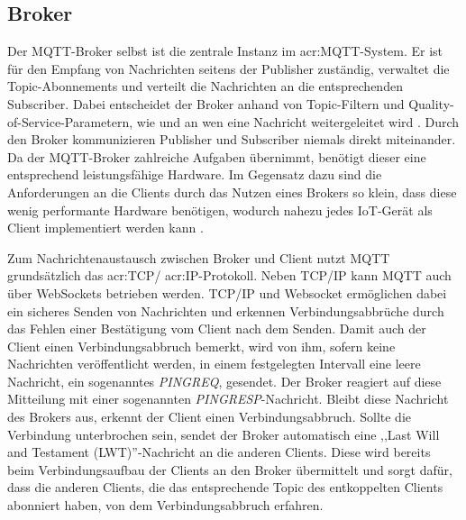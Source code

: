    \subsection{Broker}
        Der MQTT-Broker selbst ist die zentrale Instanz im \gls{acr:MQTT}-System. Er ist für den Empfang von Nachrichten seitens der Publisher zuständig, verwaltet die Topic-Abonnements und verteilt die Nachrichten an die entsprechenden Subscriber.
        Dabei entscheidet der Broker anhand von Topic-Filtern und Quality-of-Service-Parametern, wie und an wen eine Nachricht weitergeleitet wird \autocite[11]{hivemqMQTTMQTT5}. Durch den Broker kommunizieren Publisher und Subscriber niemals direkt miteinander. Da der MQTT-Broker zahlreiche Aufgaben übernimmt, benötigt dieser eine entsprechend leistungsfähige Hardware. Im Gegensatz dazu sind die Anforderungen an die Clients durch das Nutzen eines Brokers so klein, dass diese wenig performante Hardware benötigen, wodurch nahezu jedes IoT-Gerät als Client implementiert werden kann  \autocite[117--118]{angewandteNetzwerktechnik}. 
        
        Zum Nachrichtenaustausch zwischen Broker und Client nutzt MQTT grundsätzlich das \gls{acr:TCP}/ \gls{acr:IP}-Protokoll. Neben TCP/IP kann MQTT auch über WebSockets betrieben werden. TCP/IP und Websocket ermöglichen dabei ein sicheres Senden von Nachrichten und erkennen Verbindungsabbrüche durch das Fehlen einer Bestätigung vom Client nach dem Senden. Damit auch der Client einen Verbindungsabbruch bemerkt, wird von ihm, sofern keine Nachrichten veröffentlicht werden, in einem festgelegten Intervall eine leere Nachricht, ein sogenanntes \textit{PINGREQ}, gesendet. Der Broker reagiert auf diese Mitteilung mit einer sogenannten \textit{PINGRESP}-Nachricht. Bleibt diese Nachricht des Brokers aus, erkennt der Client einen Verbindungsabbruch. Sollte die Verbindung unterbrochen sein, sendet der Broker automatisch eine ,,Last Will and Testament (LWT)''-Nachricht an die anderen Clients. Diese wird bereits beim Verbindungsaufbau der Clients an den Broker übermittelt und sorgt dafür, dass die anderen Clients, die das entsprechende Topic des entkoppelten Clients abonniert haben, von dem Verbindungsabbruch erfahren. \autocite[119]{angewandteNetzwerktechnik}
    
